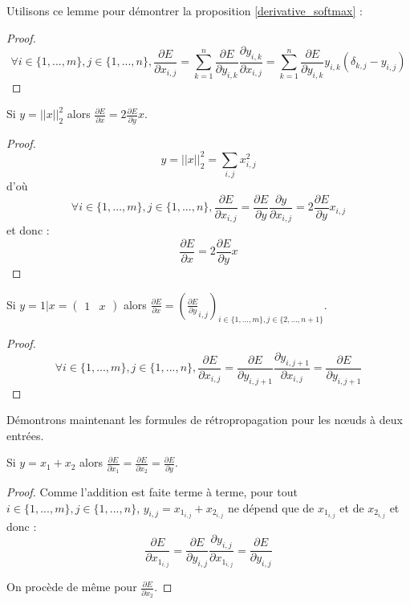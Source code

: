 Utilisons ce lemme pour démontrer la proposition \ref{derivative_softmax} :

\begin{proof}
$$
\forall i \in \{1, ..., m\}, j \in \{1, ..., n\}, \frac{\partial E}{\partial x_{i, j}} = \sum_{k = 1}^{n}{\frac{\partial E}{\partial y_{i, k}}\frac{\partial y_{i, k}}{\partial x_{i, j}}} = \sum_{k = 1}^{n}{\frac{\partial E}{\partial y_{i, k}}y_{i,k}(\delta_{k, j} - y_{i,j})}
$$
\end{proof}

\begin{proposition}
Si $y = ||x||_2^2$ alors $\frac{\partial E}{\partial x} = 2\frac{\partial E}{\partial y}x$.
\end{proposition}

\begin{proof}
$$
y = ||x||_2^2 = \sum_{i,j}{x_{i,j}^2}
$$
d'où
$$
\forall i \in \{1, ..., m\}, j \in \{1, ..., n\}, \frac{\partial E}{\partial x_{i, j}} = \frac{\partial E}{\partial y}\frac{\partial y}{\partial x_{i, j}} = 2\frac{\partial E}{\partial y}x_{i,j}
$$
et donc :
$$
\frac{\partial E}{\partial x} = 2\frac{\partial E}{\partial y}x
$$
\end{proof}

\begin{proposition}
Si $y = 1|x = \begin{pmatrix}1 & x\end{pmatrix}$ alors $\frac{\partial E}{\partial x} = (\frac{\partial E}{\partial y}_{i, j})_{i \in \{1, ..., m\}, j \in \{2, ..., n+1\}}$.
\end{proposition}

\begin{proof}
$$
\forall i \in \{1, ..., m\}, j \in \{1, ..., n\}, \frac{\partial E}{\partial x_{i, j}} = \frac{\partial E}{\partial y_{i, j+1}}\frac{\partial y_{i, j+1}}{\partial x_{i, j}} = \frac{\partial E}{\partial y_{i, j+1}}
$$
\end{proof}

Démontrons maintenant les formules de rétropropagation pour les n\oe{}uds à deux entrées.

\begin{proposition}
Si $y = x_1 + x_2$ alors $\frac{\partial E}{\partial x_1} = \frac{\partial E}{\partial x_2} = \frac{\partial E}{\partial y}$.
\end{proposition}

\begin{proof}
Comme l'addition est faite terme à terme, pour tout $i \in \{1, ..., m\}, j \in \{1, ..., n\}$, $y_{i, j} = x_{1_{i, j}} + x_{2_{i, j}}$ ne dépend que de $x_{1_{i, j}}$ et de $x_{2_{i, j}}$ et donc :
$$
\frac{\partial E}{\partial x_{1_{i, j}}} = \frac{\partial E}{\partial y_{i, j}}\frac{\partial y_{i, j}}{\partial x_{1_{i, j}}} = \frac{\partial E}{\partial y_{i, j}}
$$ 

On procède de même pour $\frac{\partial E}{\partial x_2}$.
\end{proof}

